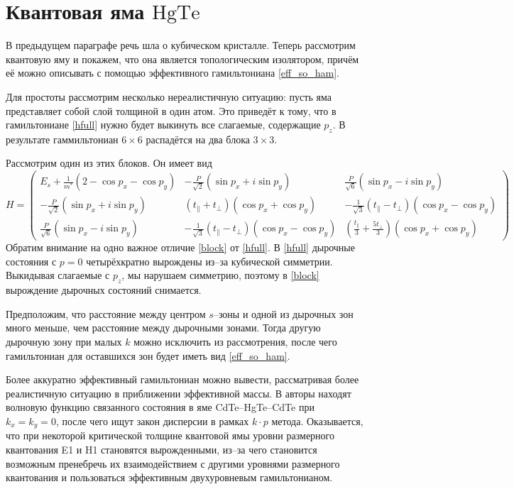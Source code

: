 \section{Квантовая яма $\mathrm{HgTe}$}
В предыдущем параграфе речь шла о кубическом кристалле. Теперь рассмотрим квантовую яму 
и покажем, что она является топологическим изолятором, причём её можно описывать 
с помощью эффективного гамильтониана \eqref{eff_so_ham}.

Для простоты рассмотрим несколько нереалистичную ситуацию: пусть яма представляет собой 
слой толщиной в один атом. Это приведёт к тому, что в гамильтониане \eqref{hfull} нужно
будет выкинуть все слагаемые, содержащие $p_z$. В результате гаммильтониан 
$6\times6$ распадётся на два блока $3\times3$.

Рассмотрим один из этих блоков. Он имеет вид
\begin{equation}
    \label{block}
    H = \begin{pmatrix}
            E_s + \frac{1}{m^*}(2 - \cos{p_x} - \cos{p_y}) &
            -\frac{P}{\sqrt{2}}(\sin{p_x} + i\sin{p_y}) &
            \frac{P}{\sqrt{6}}(\sin{p_x} - i\sin{p_y}) \\
            -\frac{P}{\sqrt{2}}(\sin{p_x} + i\sin{p_y}) &
            (t_\parallel + t_\perp)(\cos{p_x} + \cos{p_y}) &
            -\frac{1}{\sqrt{3}}(t_\parallel - t_\perp)(\cos{p_x} - \cos{p_y}) \\
            \frac{P}{\sqrt{6}}(\sin{p_x} - i\sin{p_y}) &
            -\frac{1}{\sqrt{3}}(t_\parallel - t_\perp)(\cos{p_x} - \cos{p_y}) &
            \left(\frac{t_\parallel}{3} + \frac{5t_\perp}{3}\right)(\cos{p_x} + \cos{p_y})
        \end{pmatrix}
\end{equation}
Обратим внимание на одно важное отличие \eqref{block} от \eqref{hfull}. В \eqref{hfull}
дырочные состояния с $p = 0$ четырёхкратно вырождены из--за кубической симметрии. 
Выкидывая слагаемые с $p_z$, мы нарушаем симметрию, поэтому в \eqref{block} вырождение 
дырочных состояний снимается. 

Предположим, что расстояние между центром $s$--зоны и одной из дырочных зон много меньше,
чем расстояние между дырочными зонами. Тогда другую дырочную зону при малых $k$ можно 
исключить из рассмотрения, после чего гамильтониан для оставшихся зон будет иметь вид
\eqref{eff_so_ham}.

Более аккуратно эффективный гамильтониан можно вывести, рассматривая более реалистичную
ситуацию в приближении эффективной массы. В \cite{Bernevig2006} авторы находят волновую 
функцию связанного состояния в яме CdTe--HgTe--CdTe при $k_x = k_y = 0$, после чего
ищут закон дисперсии в рамках $k\cdot p$ метода. Оказывается, что при некоторой критической
толщине квантовой ямы уровни размерного квантования E1 и H1 становятся вырожденными, из--за
чего становится возможным пренебречь их взаимодействием с другими уровнями размерного
квантования и пользоваться эффективным двухуровневым гамильтонианом. 

